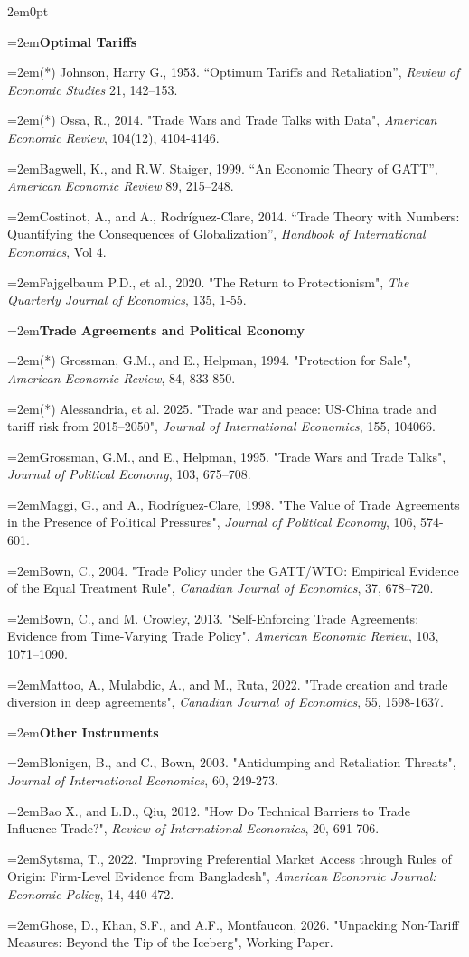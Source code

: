 \documentclass[10pt]{article}
\newcommand{\reading}{\par\hangindent=2em\hangafter=1\noindent}
\newenvironment{readingsblock}{%
  \begin{adjustwidth}{2em}{0pt} %
}{%
  \end{adjustwidth}
}
\begin{document}
  \begin{readingsblock}
  
  \reading \textbf{Optimal Tariffs} \\[4pt]
  
  \reading (*) Johnson, Harry G., 1953. “Optimum Tariffs and Retaliation”, {\it Review of Economic Studies} 21, 142–153.
  \reading (*) Ossa, R., 2014. "Trade Wars and Trade Talks with Data", {\it American Economic Review}, 104(12), 4104-4146.
  \reading Bagwell, K., and R.W. Staiger, 1999. “An Economic Theory of GATT”, {\it American Economic Review} 89, 215–248.
  \reading Costinot, A., and A., Rodríguez-Clare, 2014. “Trade Theory with Numbers: Quantifying the Consequences of Globalization”, {\it Handbook of International Economics}, Vol 4.
  \reading Fajgelbaum P.D., et al., 2020. "The Return to Protectionism", {\it The Quarterly Journal of Economics}, 135, 1-55. \\[4pt]
  
  
  \reading \textbf{Trade Agreements and Political Economy} \\[4pt]
  
  \reading (*) Grossman, G.M., and E., Helpman, 1994. "Protection for Sale", {\it American Economic Review}, 84, 833-850.
  \reading (*) Alessandria, et al. 2025. "Trade war and peace: US-China trade and tariff risk from 2015–2050", {\it Journal of International Economics}, 155, 104066.
  \reading Grossman, G.M., and E., Helpman, 1995. "Trade Wars and Trade Talks", {\it Journal of Political Economy}, 103, 675–708.
  \reading Maggi, G., and A., Rodríguez-Clare, 1998. "The Value of Trade Agreements in the Presence of Political Pressures", {\it Journal of Political Economy}, 106, 574-601.
  \reading Bown, C., 2004. "Trade Policy under the GATT/WTO: Empirical Evidence of the Equal Treatment Rule", {\it Canadian Journal of Economics}, 37, 678–720.
  \reading Bown, C., and M. Crowley, 2013. "Self-Enforcing Trade Agreements: Evidence from Time-Varying Trade Policy", {\it American Economic Review}, 103, 1071–1090.
  \reading Mattoo, A., Mulabdic, A., and M., Ruta, 2022. "Trade creation and trade diversion in deep agreements", {\it Canadian Journal of Economics}, 55, 1598-1637.
  \\[4pt]
  
  \reading \textbf{Other Instruments} \\[4pt]
  
  \reading Blonigen, B., and C., Bown, 2003. "Antidumping and Retaliation Threats", {\it Journal of International Economics}, 60, 249-273. 
  \reading Bao X., and L.D., Qiu, 2012. "How Do Technical Barriers to Trade Influence Trade?", {\it Review of International Economics}, 20, 691-706.
  \reading Sytsma, T., 2022. "Improving Preferential Market Access through Rules of Origin: Firm-Level Evidence from Bangladesh", {\it American Economic Journal: Economic Policy}, 14, 440-472.
  \reading Ghose, D., Khan, S.F., and A.F., Montfaucon, 2026. "Unpacking Non-Tariff Measures: Beyond the Tip of the Iceberg", Working Paper.
  \\[4pt]
  
  \end{readingsblock}
  
\end{document}

